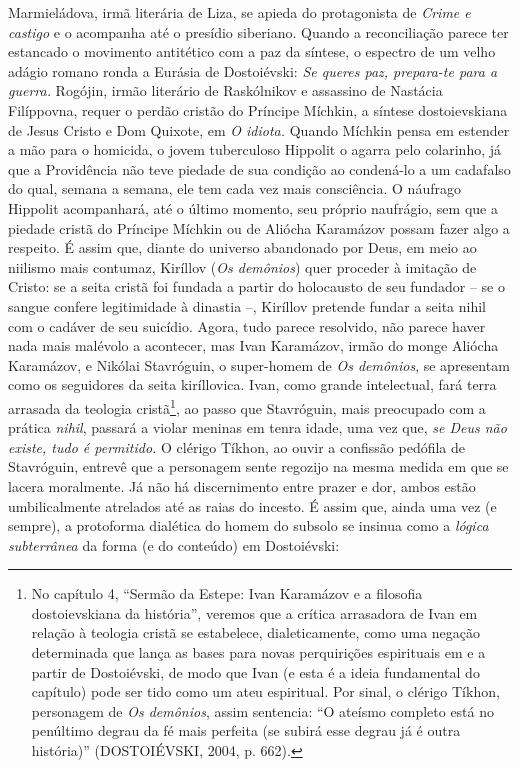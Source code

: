 Marmieládova, irmã literária de Liza, se apieda do protagonista de
\emph{Crime e castigo} e o acompanha até o presídio siberiano. Quando a
reconciliação parece ter estancado o movimento antitético com a paz da
síntese, o espectro de um velho adágio romano ronda a Eurásia de
Dostoiévski: \emph{Se queres paz, prepara-te para a guerra.} Rogójin,
irmão literário de Raskólnikov e assassino de Nastácia Filíppovna,
requer o perdão cristão do Príncipe Míchkin, a síntese dostoievskiana de
Jesus Cristo e Dom Quixote, em \emph{O idiota.} Quando Míchkin pensa em
estender a mão para o homicida, o jovem tuberculoso Hippolit o agarra
pelo colarinho, já que a Providência não teve piedade de sua condição ao
condená-lo a um cadafalso do qual, semana a semana, ele tem cada vez
mais consciência. O náufrago Hippolit acompanhará, até o último momento,
seu próprio naufrágio, sem que a piedade cristã do Príncipe Míchkin ou
de Aliócha Karamázov possam fazer algo a respeito. É assim que, diante
do universo abandonado por Deus, em meio ao niilismo mais contumaz,
Kiríllov (\emph{Os demônios}) quer proceder à imitação de Cristo: se a
seita cristã foi fundada a partir do holocausto de seu fundador -- se o
sangue confere legitimidade à dinastia --, Kiríllov pretende fundar a
seita nihil com o cadáver de seu suicídio. Agora, tudo parece resolvido,
não parece haver nada mais malévolo a acontecer, mas Ivan Karamázov,
irmão do monge Aliócha Karamázov, e Nikólai Stavróguin, o super-homem de
\emph{Os demônios}, se apresentam como os seguidores da seita
kiríllovica. Ivan, como grande intelectual, fará terra arrasada da
teologia cristã\footnote{No capítulo 4, ``Sermão da Estepe: Ivan
  Karamázov e a filosofia dostoievskiana da história'', veremos que a
  crítica arrasadora de Ivan em relação à teologia cristã se estabelece,
  dialeticamente, como uma negação determinada que lança as bases para
  novas perquirições espirituais em e a partir de Dostoiévski, de modo
  que Ivan (e esta é a ideia fundamental do capítulo) pode ser tido como
  um ateu espiritual. Por sinal, o clérigo Tíkhon, personagem de
  \emph{Os demônios}, assim sentencia: ``O ateísmo completo está no
  penúltimo degrau da fé mais perfeita (se subirá esse degrau já é outra
  história)'' (DOSTOIÉVSKI, 2004, p. 662).}, ao passo que Stavróguin,
mais preocupado com a prática \emph{nihil}, passará a violar meninas em
tenra idade, uma vez que, \emph{se Deus não existe, tudo é permitido.} O
clérigo Tíkhon, ao ouvir a confissão pedófila de Stavróguin, entrevê que
a personagem sente regozijo na mesma medida em que se lacera moralmente.
Já não há discernimento entre prazer e dor, ambos estão umbilicalmente
atrelados até as raias do incesto. É assim que, ainda uma vez (e
sempre), a protoforma dialética do homem do subsolo se insinua como a
\emph{lógica subterrânea} da forma (e do conteúdo) em Dostoiévski:


